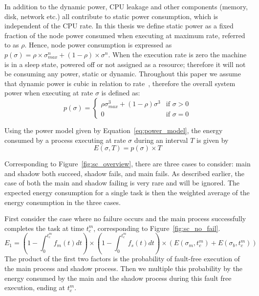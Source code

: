 In addition to the dynamic power, CPU leakage and other components
(memory, disk, network etc.) all contribute to static power
consumption, which is independent of the CPU rate. In this thesis we
define static power as a fixed fraction of the node power consumed
when executing at maximum rate, referred to as $\rho$. Hence, node power consumption is expressed as
$p(\sigma)=\rho \times \sigma_{max}^n + (1-\rho)\times \sigma^n$. When the execution rate is zero
the machine is in a sleep state, powered off or not assigned as a
resource; therefore it will not be consuming any power, static or
dynamic.  Throughout this paper we assume that dynamic power is cubic
in relation to
rate~\cite{rusu2003maximizing,zhai2004theoretical}, therefore the
overall system power when executing at rate $\sigma$ is defined as:
\begin{equation}
p(\sigma) = \begin{cases} \rho \sigma_{max}^3 + (1-\rho) \sigma^3 & \mbox{if } \sigma > 0 \\ 
                          0 & \mbox{if } \sigma = 0 \end{cases}
\label{eq:power_model}
\end{equation}

Using the power model given by Equation~\ref{eq:power_model}, the
energy consumed by a process executing at rate $\sigma$ during an
interval $T$ is given by
\begin{equation}
E(\sigma,T) = p(\sigma) \times T
\end{equation}


Corresponding to Figure~\ref{fig:sc_overview}, there are three cases to consider: main and shadow both succeed, shadow fails, 
and main fails. As described earlier, the case of both the main and
shadow failing is very rare and will be ignored. The expected
energy consumption for a single task is then the weighted average of
the energy consumption in the three cases.

First consider the case where no failure occurs and the main process
successfully completes the task at time $t_c^m$, corresponding to Figure~\ref{fig:sc_no_fail}.
\begin{equation}
E_1 =  ( 1-\int_0^{t_c^m}f_m(t)dt) \times (1 - \int_0^{t_c^m} f_s(t)dt) \times (  E(\sigma_m,t_c^m) + E(\sigma_b,t_c^m))
\label{eq:energy_no_failure}
\end{equation}
The product of the first two factors is the probability of fault-free execution of the main
process and shadow process. Then we multiple this probability by the
energy consumed by the main and the shadow process during this fault
free execution, ending at $t_c^m$.

